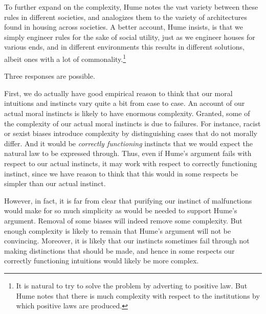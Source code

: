 To further expand on the complexity, Hume notes the vast variety between these rules in different societies,
and analogizes them to the variety of architectures found in housing across societies. A better account,
Hume insists, is that we simply engineer rules for the sake of social utility, just as we engineer houses
for various ends, and in different environments this results in different solutions, albeit ones with a
lot of commonality.\footnote{It is natural to try to solve the problem by adverting to positive law. But
Hume notes that there is much complexity with respect to the institutions by which positive laws are produced.}

Three responses are possible. 

First, we do actually have good empirical reason to think that our moral 
intuitions and instincts vary quite a bit from case to case. An account of our actual moral instincts 
is likely to have enormous complexity. Granted, some of the complexity of our actual moral instincts 
is due to failures. For instance, racist or sexist biases introduce complexity by distinguishing cases that do
not morally differ. And it would be \textit{correctly functioning} instincts that we would expect the natural
law to be expressed through. Thus, even if Hume's argument fails with respect to our actual instincts, it may
work with respect to correctly functioning instinct, since we have reason to think that this would in some
respects be simpler than our actual instinct. 

However, in fact, it is far from clear that purifying our instinct of malfunctions would make for so 
much simplicity as would be needed to support Hume's argument. Removal of some biases will indeed remove
some complexity. But enough complexity is likely to remain that Hume's argument will not be convincing.
Moreover, it is likely that our instincts sometimes fail through not making distinctions that should be made,
and hence in some respects our correctly functioning intuitions would likely be more complex.

